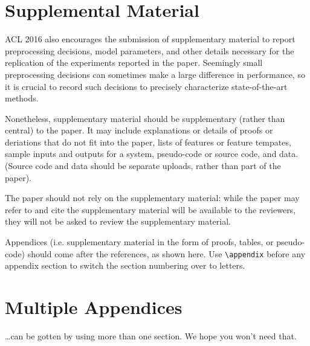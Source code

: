 \documentclass[11pt]{article}
\begin{document}
\section{Supplemental Material}
\label{sec:supplemental}
ACL 2016 also encourages the submission of supplementary material
to report preprocessing decisions, model parameters, and other details
necessary for the replication of the experiments reported in the
paper. Seemingly small preprocessing decisions can sometimes make
a large difference in performance, so it is crucial to record such
decisions to precisely characterize state-of-the-art methods.

Nonetheless, supplementary material should be supplementary (rather
than central) to the paper. It may include explanations or details
of proofs or deriations that do not fit into the paper, lists of
features or feature tempates, sample inputs and outputs for a system,
pseudo-code or source code, and data. (Source code and data should
be separate uploads, rather than part of the paper).

The paper should not rely on the supplementary material: while the paper
may refer to and cite the supplementary material will be available to the
reviewers, they will not be asked to review the
supplementary material.

Appendices (i.e. supplementary material in the form of proofs, tables,
or pseudo-code) should come after the references, as shown here. Use
\verb|\appendix| before any appendix section to switch the section
numbering over to letters.

\section{Multiple Appendices}
\dots can be gotten by using more than one section. We hope you won't
need that.
\end{document}
